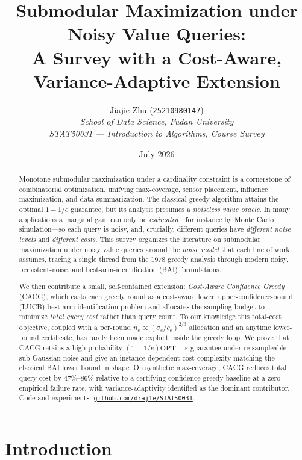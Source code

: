 \documentclass[11pt]{article}
\title{\textbf{Submodular Maximization under Noisy Value Queries:\\
A Survey with a Cost-Aware, Variance-Adaptive Extension}}
\author{%
  Jiajie Zhu (\texttt{25210980147})\\
  \textit{School of Data Science, Fudan University}\\[2pt]
  \textit{STAT50031 --- Introduction to Algorithms, Course Survey}%
}
\date{July 2026}
\theoremstyle{plain}
\theoremstyle{definition}
\newcommand{\OPT}{\mathrm{OPT}}
\begin{document}
\maketitle

\begin{abstract}
Monotone submodular maximization under a cardinality constraint is a
cornerstone of combinatorial optimization, unifying max-coverage, sensor
placement, influence maximization, and data summarization. The classical
greedy algorithm attains the optimal $1-1/e$ guarantee, but its analysis
presumes a \emph{noiseless value oracle}. In many applications a marginal
gain can only be \emph{estimated}---for instance by Monte Carlo
simulation---so each query is noisy, and, crucially, different queries have
\emph{different noise levels} and \emph{different costs}. This survey
organizes the literature on submodular maximization under noisy value
queries around the \emph{noise model} that each line of work assumes,
tracing a single thread from the 1978 greedy analysis through modern
noisy, persistent-noise, and best-arm-identification (BAI) formulations.

We then contribute a small, self-contained extension: \emph{Cost-Aware
Confidence Greedy} (CACG), which casts each greedy round as a cost-aware
lower--upper-confidence-bound (LUCB) best-arm identification problem and
allocates the sampling budget to minimize \emph{total query cost} rather
than query count. To our knowledge this total-cost objective, coupled with
a per-round $n_e\propto(\sigma_e/c_e)^{2/3}$ allocation and an anytime
lower-bound certificate, has rarely been made explicit inside the greedy
loop. We prove that CACG retains a high-probability
$(1-1/e)\OPT-\varepsilon$ guarantee under re-sampleable sub-Gaussian noise
and give an instance-dependent cost complexity matching the classical BAI
lower bound in shape. On synthetic max-coverage, CACG reduces total query
cost by $47\%$--$86\%$ relative to a certifying confidence-greedy baseline
at a zero empirical failure rate, with variance-adaptivity identified as
the dominant contributor. Code and experiments:
\href{https://github.com/draj1e/STAT50031}{\texttt{github.com/draj1e/STAT50031}}.
\end{abstract}

\section{Introduction}\label{sec:intro}
\end{document}
